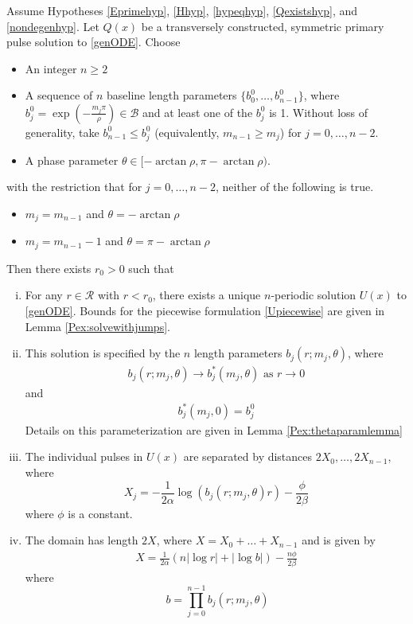\documentclass[thesis.tex]{subfiles}
\begin{document}
\begin{theorem}\label{perexist}
Assume Hypotheses \ref{Eprimehyp}, \ref{Hhyp}, \ref{hypeqhyp}, \ref{Qexistshyp}, and \ref{nondegenhyp}. Let $Q(x)$ be a transversely constructed, symmetric primary pulse solution to \eqref{genODE}. Choose
\begin{itemize}
\item An integer $n \geq 2$ 
\item A sequence of $n$ baseline length parameters $\{ b_0^0, \dots, b_{n-1}^0 \}$, where $b_j^0 = \exp\left(-\frac{m_j \pi}{\rho}\right) \in \mathcal{B}$ and at least one of the $b_j^0$ is 1. Without loss of generality, take $b_{n-1}^0 \leq b_j^0$ (equivalently, $m_{n-1} \geq m_j$) for $j = 0, \dots, n-2$.
\item A phase parameter $\theta \in [-\arctan \rho, \pi - \arctan \rho)$.
\end{itemize}
with the restriction that for $j = 0, \dots, n-2$, neither of the following is true.
\begin{itemize}
\item $m_j = m_{n-1}$ and $\theta = -\arctan \rho$
\item $m_j = m_{n-1} - 1$ and $\theta = \pi-\arctan \rho$
\end{itemize}
Then there exists $r_0 > 0$ such that
\begin{enumerate}[(i)]

\item For any $r \in \mathcal{R}$ with $r < r_0$, there exists a unique $n$-periodic solution $U(x)$ to \eqref{genODE}. Bounds for the piecewise formulation \eqref{Upiecewise} are given in Lemma \ref{Pex:solvewithjumps}.

\item This solution is specified by the $n$ length parameters $b_j(r; m_j, \theta)$, where
\begin{align}
b_j(r; m_j, \theta) \rightarrow b^*_j(m_j, \theta) \text{ as } r \rightarrow 0
\end{align}
and
\begin{align}
b^*_j(m_j, 0) = b_j^0
\end{align}
Details on this parameterization are given in Lemma \ref{Pex:thetaparamlemma}

\item The individual pulses in $U(x)$ are separated by distances $2 X_0, \dots, 2 X_{n-1}$, where 
\begin{equation}\label{Xj}
X_j = -\frac{1}{2\alpha}\log(b_j(r; m_j, \theta) r) - \frac{\phi}{2 \beta} 
\end{equation}
where $\phi$ is a constant.

\item The domain has length $2X$, where $X = X_0 + \dots + X_{n-1}$ and is given by
\begin{align}
X = \frac{1}{2\alpha} (n |\log r| + |\log b| ) - \frac{n \phi}{2 \beta}
\end{align}
where 
\begin{equation}\
b = \prod_{j=0}^{n-1} b_j(r; m_j, \theta)
\end{equation}
\end{enumerate}
\end{theorem}
\end{document}
